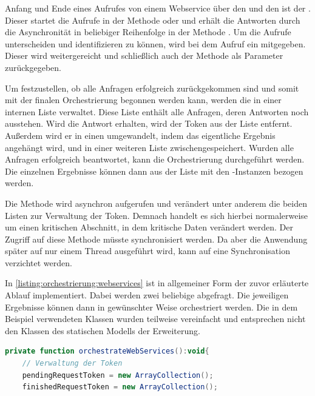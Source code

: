 \begin{onehalfspacing}
Anfang und Ende eines Aufrufes von einem Webservice über den  und den  ist der . Dieser startet die Aufrufe in der Methode  oder  und erhält die Antworten durch die Asynchronität in beliebiger Reihenfolge in der Methode . Um die Aufrufe unterscheiden und identifizieren zu können, wird bei dem Aufruf ein  mitgegeben. Dieser wird weitergereicht und schließlich auch der Methode  als Parameter zurückgegeben.

Um festzustellen, ob alle Anfragen erfolgreich zurückgekommen sind und somit mit der finalen Orchestrierung begonnen werden kann, werden die  in einer internen Liste verwaltet. Diese Liste enthält alle Anfragen, deren Antworten noch ausstehen. Wird die Antwort erhalten, wird der Token aus der Liste entfernt. Außerdem wird er in einen  umgewandelt, indem das eigentliche Ergebnis angehängt wird, und in einer weiteren Liste zwischengespeichert. Wurden alle Anfragen erfolgreich beantwortet, kann die Orchestrierung durchgeführt werden. Die einzelnen Ergebnisse können dann aus der Liste mit den -Instanzen bezogen werden.

Die Methode  wird asynchron aufgerufen und verändert unter anderem die beiden Listen zur Verwaltung der Token. Demnach handelt es sich hierbei normalerweise um einen kritischen Abschnitt, in dem kritische Daten verändert werden. Der Zugriff auf diese Methode müsste synchronisiert werden. Da aber die Anwendung später auf nur einem Thread ausgeführt wird, kann auf eine Synchronisation verzichtet werden.

In \vref{listing:orchestrierung:webservices} ist in allgemeiner Form der zuvor erläuterte Ablauf implementiert. Dabei werden zwei beliebige  abgefragt. Die jeweiligen Ergebnisse können dann in gewünschter Weise orchestriert werden. Die in dem Beispiel verwendeten Klassen wurden teilweise vereinfacht und entsprechen nicht den Klassen des statischen Modells der Erweiterung.

\begin{programm}[ht]
\begin{lstlisting}[language=ActionScript]
private function orchestrateWebServices():void{
	// Verwaltung der Token
	pendingRequestToken = new ArrayCollection();
	finishedRequestToken = new ArrayCollection();
	

\end{lstlisting}
\end{programm}
\end{onehalfspacing}

